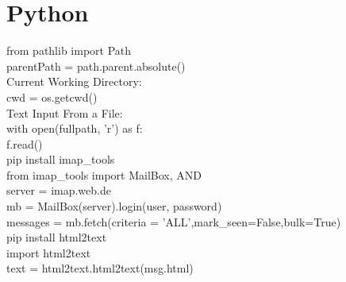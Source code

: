\chapter{Python}\label{chap:Python}
from pathlib import Path\\
parentPath = path.parent.absolute()\\\medskip
Current Working Directory:\\
cwd = os.getcwd()\\\medskip
Text Input From a File:\\
with open(fullpath, 'r') as f:\\
f.read()\\\medskip
pip install imap\_tools\\
from imap\_tools import MailBox, AND\\
server = imap.web.de\\
mb = MailBox(server).login(user, password)\\
messages = mb.fetch(criteria = 'ALL',mark_seen=False,bulk=True)\\
pip install html2text\\
import html2text\\
text = html2text.html2text(msg.html)\\